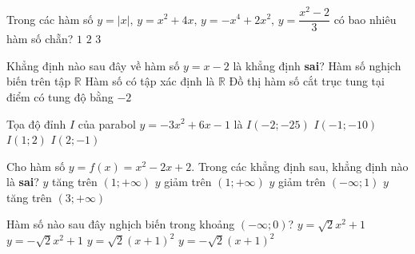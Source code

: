 \begin{ex}%
	Trong các hàm số $y = |x|,\, y = x^2 + 4x,\, y = -x^4 + 2x^2,\, y = \dfrac{x^2 - 2}{3}$ có bao nhiêu hàm số chẵn?
	{$1$}
	{$2$}
	{\True $3$}
\end{ex}

\begin{ex}%
	Khẳng định nào sau đây về hàm số $y = x - 2$ là khẳng định \textbf{sai}?
	{\True  Hàm số nghịch biến trên tập $\mathbb{R}$}
	{Hàm số có tập xác định là $\mathbb{R}$}
	{Đồ thị hàm số cắt trục tung tại điểm có tung độ bằng $-2$}
\end{ex}

\begin{ex}%
	Tọa độ đỉnh $I$ của parabol $y = -3x^2 + 6x -1$ là
	\choice
	{$I(-2; -25)$}
	{$I(-1; -10)$}
	{\True  $I(1; 2)$}
	{$I(2; -1)$}
\end{ex}


\begin{ex}%
	Cho hàm số $y = f(x) = x^2 - 2x + 2$. Trong các khẳng định sau, khẳng định nào là \textbf{sai}?
	\choice
	{$y$ tăng trên $(1; +\infty)$}
	{\True $y$ giảm trên $(1; +\infty)$}
	{$y$ giảm trên $(-\infty; 1)$}
	{$y$ tăng trên $(3; +\infty)$}
\end{ex}

\begin{ex}%
	Hàm số nào sau đây nghịch biến trong khoảng $(-\infty; 0)$?
	\choice
	{\True $y =\sqrt{2}x^2 + 1$}
	{$y = -\sqrt{2}x^2 + 1$}
	{$y =\sqrt{2}(x + 1)^2$}
	{$y = -\sqrt{2}(x + 1)^2$}
\end{ex}

